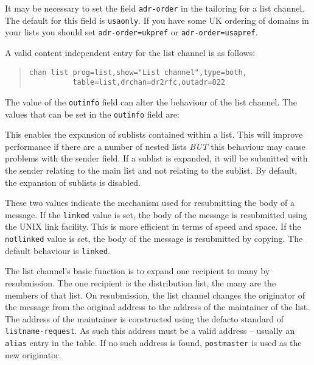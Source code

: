 It may be necessary to set the field \verb+adr-order+ in the tailoring
for a list channel.  The default for this field is \verb+usaonly+.  If
you have some UK ordering of domains in your lists you should set
\verb+adr-order=ukpref+ or \verb+adr-order=usapref+.

A valid content independent entry for the list channel is as follows:
\begin{quote}\small\begin{verbatim}
chan list prog=list,show="List channel",type=both,
          table=list,drchan=dr2rfc,outadr=822
\end{verbatim}\end{quote}

The value of the \verb+outinfo+ field can alter the behaviour of the list
channel.
The values that can be set in the \verb+outinfo+ field are:
\begin{describe}
\item[\verb+dosublists+:] This enables the expansion of sublists
contained within a list.
This will improve performance if there are a number of nested lists
{\em BUT} this behaviour may cause problems with the sender field.
If a sublist is expanded, it will be submitted with the sender
relating to the main list and not relating to the sublist.
By default, the expansion of sublists is disabled.
\item[\verb+linked+:]
\item[\verb+notlinked+:] These two values indicate the mechanism used
for resubmitting the body of a message.
If the \verb+linked+ value is set, the body of the message is
resubmitted using the UNIX link facility.
This is more efficient in terms of speed and space.
If the \verb+notlinked+ value is set, the body of the message is
resubmitted by copying.
The default behaviour is \verb+linked+.
\end{describe}

The list channel's basic function is to expand one recipient to many
by resubmission. The one recipient is the distribution list, the many
are the members of that list. On resubmission, the list channel
changes the originator of the message from the original address to the
address of the maintainer of the list.
The address of the maintainer is constructed using the defacto
standard of \verb+listname-request+.
As such this address must be a valid address -- usually an
\verb+alias+ entry in the  table.
If no such address is found, \verb+postmaster+ is used as the new
originator.

